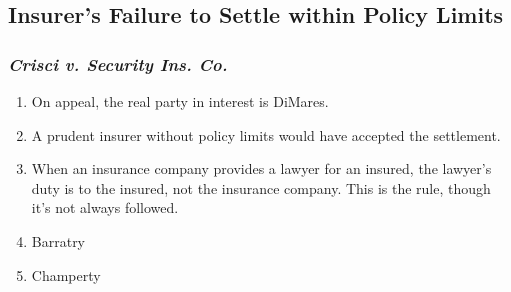 
\subsection{Insurer's Failure to Settle within Policy Limits}

\subsubsection{\emph{Crisci v. Security Ins. Co.}}

\begin{enumerate}
    \item On appeal, the real party in interest is DiMares.
    \item A prudent insurer without policy limits would have accepted the settlement.
    \item When an insurance company provides a lawyer for an insured, the lawyer's duty is to the insured, not the insurance company. This is the rule, though it's not always followed.
    \item Barratry
    \item Champerty
\end{enumerate}
